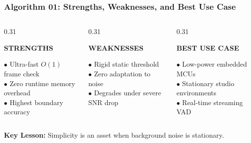 \documentclass[aspectratio=169, 10pt]{beamer}
\begin{document}
\begin{frame}
  \frametitle{Algorithm 01: Strengths, Weaknesses, and Best Use Case}
  \begin{tcolorbox}[contentframe]
  \begin{columns}[T]
    \begin{column}{0.31\textwidth}
      \begin{tcolorbox}[mintcard, height=3.85cm, valign=top]
        \centering
        {\fontsize{9.5pt}{11pt}\selectfont\color{mintGreen}\textbf{STRENGTHS}}\\[4pt]
        \raggedright{\fontsize{8.5pt}{10pt}\selectfont
        $\bullet$ Ultra-fast $O(1)$ frame check\\[3pt]
        $\bullet$ Zero runtime memory overhead\\[3pt]
        $\bullet$ Highest boundary accuracy}
      \end{tcolorbox}
    \end{column}

    \begin{column}{0.31\textwidth}
      \begin{tcolorbox}[warncard, height=3.85cm, valign=top]
        \centering
        {\fontsize{9.5pt}{11pt}\selectfont\color{amberWarn}\textbf{WEAKNESSES}}\\[4pt]
        \raggedright{\fontsize{8.5pt}{10pt}\selectfont
        $\bullet$ Rigid static threshold\\[3pt]
        $\bullet$ Zero adaptation to noise\\[3pt]
        $\bullet$ Degrades under severe SNR drop}
      \end{tcolorbox}
    \end{column}

    \begin{column}{0.31\textwidth}
      \begin{tcolorbox}[glowcard, height=3.85cm, valign=top]
        \centering
        {\fontsize{9.5pt}{11pt}\selectfont\color{cyanGlow}\textbf{BEST USE CASE}}\\[4pt]
        \raggedright{\fontsize{8.5pt}{10pt}\selectfont
        $\bullet$ Low-power embedded MCUs\\[3pt]
        $\bullet$ Stationary studio environments\\[3pt]
        $\bullet$ Real-time streaming VAD}
      \end{tcolorbox}
    \end{column}
  \end{columns}
  
  \vspace{10pt}
  \begin{center}
    {\fontsize{8.5pt}{10pt}\selectfont\color{textMuted}\textbf{Key Lesson:} Simplicity is an asset when background noise is stationary.}
  \end{center}
  \end{tcolorbox}
\end{frame}
\end{document}
